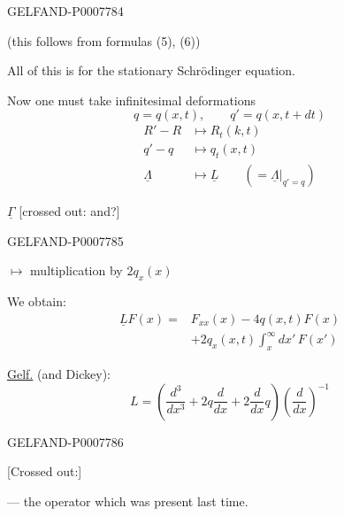 \begin{GelfandAdjacentEvidence}{GELFAND-P000778}{4}

(this follows from formulas (5), (6))

All of this is for the stationary Schrödinger equation.

Now one must take infinitesimal deformations
\[
q=q(x,t),\qquad q'=q(x,t+dt)
\]
\begin{align*}
R'-R&\longmapsto R_t(k,t)\\
q'-q&\longmapsto q_t(x,t)\\
\underline\Lambda&\longmapsto\underline L\qquad(=\underline\Lambda|_{q'=q})
\end{align*}

\(\underline\Gamma\) [crossed out: and?]
\end{GelfandAdjacentEvidence}
\begin{GelfandAdjacentEvidence}{GELFAND-P000778}{5}

\(\longmapsto\) multiplication by \(2q_x(x)\)

We obtain:
\begin{equation}
\begin{split}
\underline L F(x)={}&F_{xx}(x)-4q(x,t)F(x)\\
&+2q_x(x,t)\int_x^\infty dx'\,F(x')
\end{split}\tag{12}
\end{equation}

\underline{Gelf.} (and Dickey):
\[
L=\left(\frac{d^3}{dx^3}+2q\frac{d}{dx}+2\frac{d}{dx}q\right)
\left(\frac{d}{dx}\right)^{-1}
\]
\end{GelfandAdjacentEvidence}
\begin{GelfandAdjacentEvidence}{GELFAND-P000778}{6}


[Crossed out:]
\end{GelfandAdjacentEvidence}


--- the operator which was present last time.


